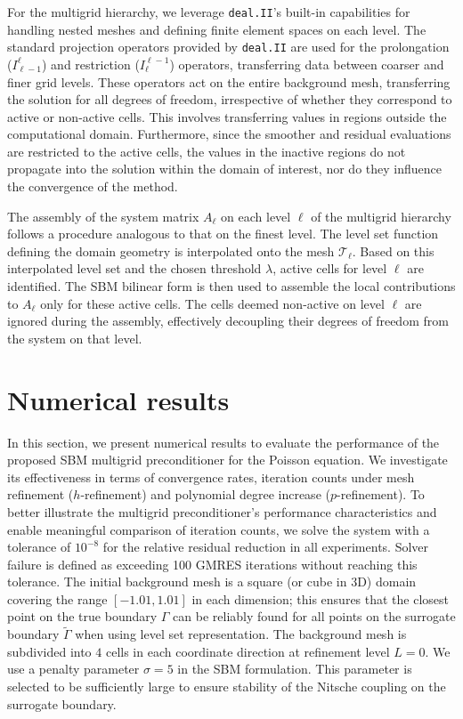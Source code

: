 \documentclass{elsarticle}
\begin{document}
For the multigrid hierarchy, we leverage \texttt{deal.II}'s built-in capabilities for handling nested meshes and
defining finite element spaces on each level. The standard projection operators provided by \texttt{deal.II} are used
for the prolongation ($I_{\ell-1}^\ell$) and restriction ($I_\ell^{\ell-1}$) operators, transferring data between
coarser and finer grid levels. These operators act on the entire background mesh, transferring the solution for all
degrees of freedom, irrespective of whether they correspond to active or non-active cells. This involves transferring
values in regions outside the computational domain. Furthermore, since the smoother and residual evaluations are
restricted to the active cells, the values in the inactive regions do not propagate into the solution within the domain
of interest, nor do they influence the convergence of the method.

The assembly of the system matrix $A_\ell$ on each level $\ell$ of the multigrid hierarchy follows a procedure
analogous to that on the finest level. The level set function defining the domain geometry is interpolated onto the
mesh $\mathcal{T}_\ell$. Based on this interpolated level set and the chosen threshold $\lambda$, active cells for
level $\ell$ are identified. The SBM bilinear form is then used to assemble the local contributions to $A_\ell$ only
for these active cells. The cells deemed non-active on level $\ell$ are ignored during the assembly, effectively
decoupling their degrees of freedom from the system on that level.

\section{Numerical results}
\label{sec:numerical_results}
In this section, we present numerical results to evaluate the performance of the proposed SBM multigrid
preconditioner for the Poisson equation. We investigate its effectiveness in terms of convergence rates, iteration
counts under mesh refinement ($h$-refinement) and polynomial degree increase ($p$-refinement). To better illustrate the
multigrid preconditioner's performance characteristics and enable meaningful comparison of iteration counts, we solve
the system with a tolerance of $10^{-8}$ for the relative residual reduction in all experiments.
Solver failure is defined as exceeding 100 GMRES iterations without reaching this tolerance.
The initial background mesh is a square (or cube in 3D) domain covering the range $[-1.01, 1.01]$ in each dimension; this ensures that the closest point on the true boundary $\Gamma$ can be reliably found for all points on the surrogate boundary $\tilde{\Gamma}$ when using level set representation. The background mesh is
subdivided into $4$ cells in each coordinate direction at refinement level $L=0$. We use a penalty parameter $\sigma = 5$ in the SBM
formulation. This parameter is selected to be sufficiently large to ensure stability of the Nitsche coupling on the
surrogate boundary.
\end{document}
